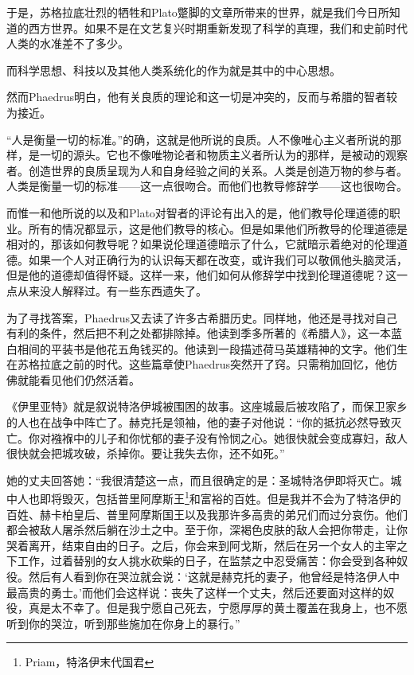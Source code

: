 \documentclass[UTF8]{article}
\begin{document}
\par 于是，苏格拉底壮烈的牺牲和Plato蹩脚的文章所带来的世界，就是我们今日所知道的西方世界。如果不是在文艺复兴时期重新发现了科学的真理，我们和史前时代人类的水准差不了多少。
\par 而科学思想、科技以及其他人类系统化的作为就是其中的中心思想。
\par 然而Phaedrus明白，他有关良质的理论和这一切是冲突的，反而与希腊的智者较为接近。
\par “人是衡量一切的标准。”的确，这就是他所说的良质。人不像唯心主义者所说的那样，是一切的源头。它也不像唯物论者和物质主义者所认为的那样，是被动的观察者。创造世界的良质呈现为人和自身经验之间的关系。人类是创造万物的参与者。人类是衡量一切的标准——这一点很吻合。而他们也教导修辞学——这也很吻合。
\par 而惟一和他所说的以及和Plato对智者的评论有出入的是，他们教导伦理道德的职业。所有的情况都显示，这是他们教导的核心。但是如果他们所教导的伦理道德是相对的，那该如何教导呢？如果说伦理道德暗示了什么，它就暗示着绝对的伦理道德。如果一个人对正确行为的认识每天都在改变，或许我们可以敬佩他头脑灵活，但是他的道德却值得怀疑。这样一来，他们如何从修辞学中找到伦理道德呢？这一点从来没人解释过。有一些东西遗失了。
\par 为了寻找答案，Phaedrus又去读了许多古希腊历史。同样地，他还是寻找对自己有利的条件，然后把不利之处都排除掉。他读到季多所著的《希腊人》，这一本蓝白相间的平装书是他花五角钱买的。他读到一段描述荷马英雄精神的文字。他们生在苏格拉底之前的时代。这些篇章使Phaedrus突然开了窍。只需稍加回忆，他仿佛就能看见他们仍然活着。
\par 《伊里亚特》就是叙说特洛伊城被围困的故事。这座城最后被攻陷了，而保卫家乡的人也在战争中阵亡了。赫克托是领袖，他的妻子对他说：“你的抵抗必然导致灭亡。你对襁褓中的儿子和你忧郁的妻子没有怜悯之心。她很快就会变成寡妇，敌人很快就会把城攻破，杀掉你。要让我失去你，还不如死。”
\par 她的丈夫回答她：“我很清楚这一点，而且很确定的是：圣城特洛伊即将灭亡。城中人也即将毁灭，包括普里阿摩斯王\footnote{Priam，特洛伊末代国君}和富裕的百姓。但是我并不会为了特洛伊的百姓、赫卡柏皇后、普里阿摩斯国王以及我那许多高贵的弟兄们而过分哀伤。他们都会被敌人屠杀然后躺在沙土之中。至于你，深褐色皮肤的敌人会把你带走，让你哭着离开，结束自由的日子。之后，你会来到阿戈斯，然后在另一个女人的主宰之下工作，过着替别的女人挑水砍柴的日子，在监禁之中忍受痛苦：你会受到各种奴役。然后有人看到你在哭泣就会说：‘这就是赫克托的妻子，他曾经是特洛伊人中最高贵的勇士。’而他们会这样说：丧失了这样一个丈夫，然后还要面对这样的奴役，真是太不幸了。但是我宁愿自己死去，宁愿厚厚的黄土覆盖在我身上，也不愿听到你的哭泣，听到那些施加在你身上的暴行。”
\end{document}
